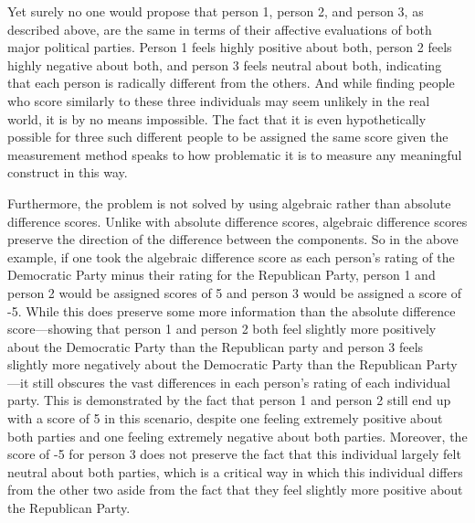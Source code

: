 \documentclass[authordate, meta]{jote-new-article}
\begin{document}
	Yet surely no one would propose that person 1, person 2, and person 3, as described above, are the same in terms of their affective evaluations of both major political parties. Person 1 feels highly positive about both, person 2 feels highly negative about both, and person 3 feels neutral about both, indicating that each person is radically different from the others. And while finding people who score similarly to these three individuals may seem unlikely in the real world, it is by no means impossible. The fact that it is even hypothetically possible for three such different people to be assigned the same score given the measurement method speaks to how problematic it is to measure any meaningful construct in this way.



	Furthermore, the problem is not solved by using algebraic rather than absolute difference scores. Unlike with absolute difference scores, algebraic difference scores preserve the direction of the difference between the components. So in the above example, if one took the algebraic difference score as each person's rating of the Democratic Party minus their rating for the Republican Party, person 1 and person 2 would be assigned scores of 5 and person 3 would be assigned a score of -5. While this does preserve some more information than the absolute difference score—showing that person 1 and person 2 both feel slightly more positively about the Democratic Party than the Republican party and person 3 feels slightly more negatively about the Democratic Party than the Republican Party—it still obscures the vast differences in each person's rating of each individual party. This is demonstrated by the fact that person 1 and person 2 still end up with a score of 5 in this scenario, despite one feeling extremely positive about both parties and one feeling extremely negative about both parties. Moreover, the score of -5 for person 3 does not preserve the fact that this individual largely felt neutral about both parties, which is a critical way in which this individual differs from the other two aside from the fact that they feel slightly more positive about the Republican Party.
\end{document}
